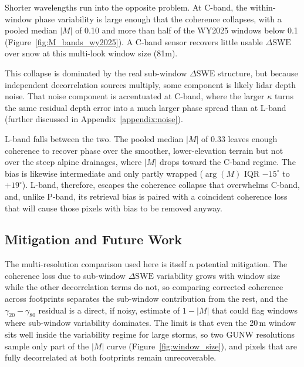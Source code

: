 \documentclass[tc, manuscript]{copernicus}
\begin{document}
Shorter wavelengths run into the opposite problem. At C-band, the within-window phase variability is large enough that the coherence collapses, with a pooled median $|M|$ of 0.10 and more than half of the WY2025 windows below 0.1 (Figure~\ref{fig:M_bands_wy2025}). A C-band sensor recovers little usable $\Delta\mathrm{SWE}$ over snow at this multi-look window size (81m).

This collapse is dominated by the real sub-window $\Delta\mathrm{SWE}$ structure, but because independent decorrelation sources multiply, some component is likely lidar depth noise. That noise component is accentuated at C-band, where the larger $\kappa$ turns the same residual depth error into a much larger phase spread than at L-band (further discussed in Appendix~\ref{appendix:noise}).

L-band falls between the two. The pooled median $|M|$ of 0.33 leaves enough coherence to recover phase over the smoother, lower-elevation terrain but not over the steep alpine drainages, where $|M|$ drops toward the C-band regime. The bias is likewise intermediate and only partly wrapped ($\arg(M)$ IQR $-15^\circ$ to $+19^\circ$). L-band, therefore, escapes the coherence collapse that overwhelms C-band, and, unlike P-band, its retrieval bias is paired with a coincident coherence loss that will cause those pixels with bias to be removed anyway.

\subsection{Mitigation and Future Work}\label{subsec:mitigation}

The multi-resolution comparison used here is itself a potential mitigation. The coherence loss due to sub-window $\Delta\mathrm{SWE}$ variability grows with window size while the other decorrelation terms do not, so comparing corrected coherence across footprints separates the sub-window contribution from the rest, and the $\gamma_{20}-\gamma_{80}$ residual is a direct, if noisy, estimate of $1-|M|$ that could flag windows where sub-window variability dominates. The limit is that even the 20\,\unit{m} window sits well inside the variability regime for large storms, so two GUNW resolutions sample only part of the $|M|$ curve (Figure~\ref{fig:window_size}), and pixels that are fully decorrelated at both footprints remain unrecoverable.
\end{document}
